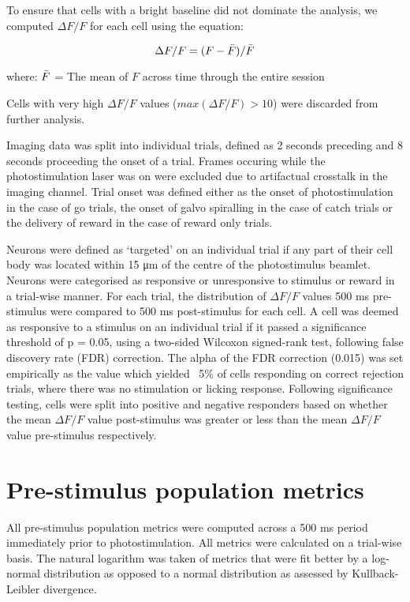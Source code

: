 To ensure that cells with a bright baseline did not dominate the analysis, we computed $\Delta F/F$ for each cell using the equation:

\begin{equation} \label{eq:dff}
\Delta F/F = (F  - \Bar{F}) / \Bar{F}
\end{equation}

where: \newline
$\Bar{F}$ = The mean of $F$ across time through the entire session

Cells with very high $\Delta F/F$ values ($max(\Delta F / F) > 10 $) were discarded from further analysis.

Imaging data was split into individual trials, defined as 2 seconds preceding and 8 seconds proceeding the onset of a trial. Frames occuring while the photostimulation laser was on were excluded due to artifactual crosstalk in the imaging channel. Trial onset was defined either as the onset of photostimulation in the case of go trials, the onset of galvo spiralling in the case of catch trials or the delivery of reward in the case of reward only trials. 

Neurons were defined as ‘targeted’ on an individual trial if any part of their cell body was located within 15 μm of the centre of the photostimulus beamlet. Neurons were categorised as responsive or unresponsive to stimulus or reward in a trial-wise manner. For each trial, the distribution of $\Delta F/F$ values 500 ms pre-stimulus were compared to 500 ms post-stimulus for each cell. A cell was deemed as responsive to a stimulus on an individual trial if it passed a significance threshold of p = 0.05, using a two-sided Wilcoxon signed-rank test, following false discovery rate (FDR) correction. The alpha of the FDR correction (0.015) was set empirically as the value which yielded ~5\% of cells responding on correct rejection trials, where there was no stimulation or licking response. Following significance testing, cells were split into positive and negative responders based on whether the mean $\Delta F/F$ value post-stimulus was greater or less than the mean $\Delta F/F$ value pre-stimulus respectively.

\section{Pre-stimulus population metrics}

All pre-stimulus population metrics were computed across a 500 ms period immediately prior to photostimulation. All metrics were calculated on a trial-wise basis. The natural logarithm was taken of metrics that were fit better by a log-normal distribution as opposed to a normal distribution as assessed by Kullback-Leibler divergence. 


